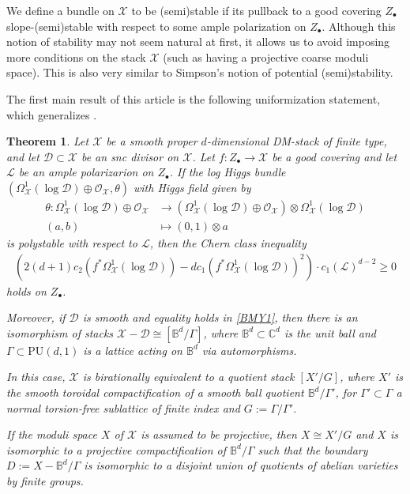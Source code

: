 \documentclass[a4paper]{amsart}
\newtheorem{theorem}{Theorem}[section]
\theoremstyle{definition}
\begin{document}
We define a bundle on $\mathscr{X}$ to be (semi)stable if its pullback to a good covering $Z_\bullet$ slope-(semi)stable with respect to some ample polarization on $Z_\bullet$. Although this notion of stability may not seem natural at first, it allows us to avoid imposing more conditions on the stack $\mathscr{X}$ (such as having a projective coarse moduli space). This is also very similar to Simpson's notion of potential (semi)stability.

The first main result of this article is the following uniformization statement, which generalizes \cite[Theorem A]{dengcadorel}.

\begin{theorem}\label{Uniformization-thm}
Let $\mathscr{X}$ be a smooth proper $d$-dimensional DM-stack of finite type, and let $\mathscr{D}\subset \mathscr{X}$ be an snc divisor on $\mathscr{X}$. Let $f:Z_\bullet\to\mathscr{X}$ be a good covering and let $\mathcal{L}$ be an ample polarizarion on $Z_\bullet$. If the log Higgs bundle $(\Omega^1_\mathscr{X}(\log \mathscr{D})\oplus\mathcal{O}_\mathscr{X},\theta)$ with Higgs field given by 
\begin{align*}
\theta:\Omega^1_{\mathscr{X}}(\log\mathscr{D})\oplus\mathcal{O}_{\mathscr{X}}&\to(\Omega^1_{\mathscr{X}}(\log\mathscr{D})\oplus\mathcal{O}_{\mathscr{X}})\otimes\Omega^1_{\mathscr{X}}(\log \mathscr{D})\\
(a,b)&\mapsto(0,1)\otimes a
\end{align*}
is polystable with respect to $\mathcal{L}$, then the Chern class inequality
\begin{align}\label{BMY1}
    (2(d+1)c_2(f^*\Omega^1_{\mathscr{X}}(\log \mathscr{D}))-dc_1(f^*\Omega^1_{\mathscr{X}}(\log \mathscr{D}))^2)\cdot c_1(\mathcal{L})^{d-2}\ge0
\end{align}
holds on $Z_\bullet$.

Moreover, if $\mathscr{D}$ is smooth and equality holds in \ref{BMY1}, then there is an isomorphism of stacks $\mathscr{X}-\mathscr{D}\cong[\mathbb{B}^d/\Gamma]$, where $\mathbb{B}^d\subset\mathbb{C}^d$ is the unit ball and $\Gamma\subset\mathrm{PU}(d,1)$ is a lattice acting on $\mathbb{B}^d$ via automorphisms.

In this case, $\mathscr{X}$ is birationally equivalent to a quotient stack $[X'/G]$, where $X'$ is the smooth toroidal compactification of a smooth ball quotient $\mathbb{B}^d/\Gamma'$, for $\Gamma'\subset\Gamma$ a normal torsion-free sublattice of finite index and $G:=\Gamma/\Gamma'$. 

If the moduli space $X$ of $\mathscr{X}$ is assumed to be projective, then $X\cong X'/G$ and $X$ is isomorphic to a projective compactification of $\mathbb{B}^d/\Gamma$ such that the boundary $D:=X-\mathbb{B}^d/\Gamma$ is isomorphic to a disjoint union of quotients of abelian varieties by finite groups.
\end{theorem}
\end{document}
